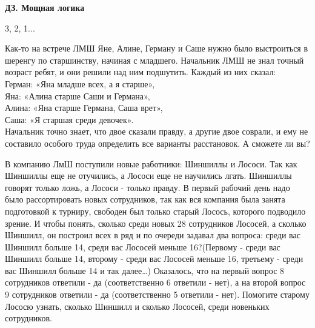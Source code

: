 \centerline{\bf \Huge ДЗ. Мощная логика}
\centerline{\bf \Huge }


\begin{flushright}
        \scriptsize{3, 2, 1...}
\end{flushright}

 Как-то на встрече ЛМШ Яне, Алине, Герману и Саше нужно было выстроиться в шеренгу по старшинству, начиная с младшего. Начальник ЛМШ не знал точный возраст ребят, и они решили над ним подшутить.
Каждый из них сказал:\\
Герман: «Яна младше всех, а я старше»,\\
Яна: «Алина старше Саши и Германа»,\\
Алина: «Яна старше Германа, Саша врет»,\\
Саша: «Я старшая среди девочек».\\
Начальник точно знает, что двое сказали правду, а другие двое соврали, и ему не составило особого труда определить все варианты расстановок. А сможете ли вы?

 В компанию ЛмШ поступили новые работники: Шиншиллы и Лососи. Так как Шиншиллы еще не отучились, а Лососи еще не научились лгать. Шиншиллы говорят только ложь, а Лососи - только правду.
В первый рабочий день надо было рассортировать новых сотрудников, так как вся компания была занята подготовкой к турниру, свободен был только старый Лосось, которого подводило зрение. И чтобы понять, сколько среди новых 28 сотрудников Лососей, а сколько Шиншилл, он построил всех в ряд и по очереди задавал два вопроса: среди вас Шиншилл больше 14, среди вас Лососей меньше 16?(Первому - среди вас Шиншилл больше 14, второму - среди вас Лососей меньше 16, третьему - среди вас Шиншилл больше 14 и так далее…)
Оказалось, что на первый вопрос 8 сотрудников ответили - да (соответственно 6 ответили - нет), а на второй вопрос 9 сотрудников ответили - да (соответственно 5 ответили - нет).
Помогите старому Лососю узнать, сколько Шиншилл и сколько Лососей, среди новеньких сотрудников.